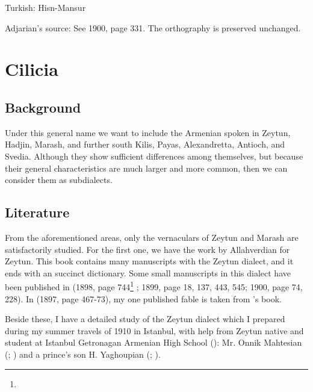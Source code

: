 Turkish: Hisn-Mansur

Adjarian's source: See  1900, page 331. The orthography is preserved unchanged. 




\chapter{Cilicia}\label{chapter:Cilicia}
\section{Background}
\begin{adjarianpage}\label{page:199}\end{adjarianpage}%

Under this general name we want to include the Armenian spoken in Zeytun, Hadjin, Marash, and further south Kilis, Payas, Alexandretta, Antioch, and Svedia. Although they show sufficient differences among themselves, but because their general characteristics are much larger and more common, then we can consider them as subdialects. 

\section{Literature}
From the aforementioned areas, only the vernaculars of Zeytun and Marash are satisfactorily studied. For the first one, we have the work by Allahverdian \citep{Allahverdian-1884-UlniaZeytun} for Zeytun. This book contains many manuscripts with the Zeytun dialect, and it ends with an succinct dictionary. Some small manuscripts in this dialect have been published in  (1898, page 744\footnote{} ; 1899, page 18, 137, 443, 545; 1900, page 74, 228). In  (1897, page 467-73), my one published fable is taken from \citeauthor{Allahverdian-1884-UlniaZeytun}'s book.


Beside these, I have a detailed study of the Zeytun dialect which I prepared during my summer travels of 1910 in Istanbul, with help from Zeytun native and student at Istanbul Getronagan Armenian High School (): Mr. Onnik Mahtesian (; ) and a prince's son H. Yaghoupian (; ). 




